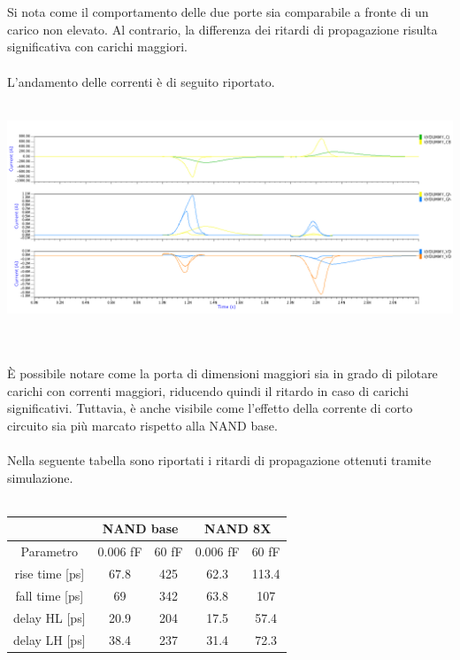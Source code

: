 \documentclass[11pt,  english, makeidx, a4paper, titlepage, oneside]{book}
\begin{document}
\\\\
Si nota come il comportamento delle due porte sia comparabile a fronte di un carico non elevato. Al contrario, la differenza dei ritardi di propagazione risulta significativa con carichi maggiori.
\\\\
L'andamento delle correnti è di seguito riportato.
\\\\
\centerline{\includegraphics[width=14cm]{./img/Lab_5/waveform_5.png}}
\\\\
È possibile notare come la porta di dimensioni maggiori sia in grado di pilotare carichi con correnti maggiori, riducendo quindi il ritardo in caso di carichi significativi. Tuttavia, è anche visibile come l'effetto della corrente di corto circuito sia più marcato rispetto alla NAND base.
\\\\
Nella seguente tabella sono riportati i ritardi di propagazione ottenuti tramite simulazione.
\\\\
\begin{center}
	\begin{tabular}{|c|c|c||c|c|}
	\hline
	& \multicolumn{2}{|c||}{NAND base} & \multicolumn{2}{|c|}{NAND 8X}\\
	\hline
	Parametro & 0.006 fF & 60 fF & 0.006 fF & 60 fF \\
	\hline
	rise time [ps] & 67.8 & 425 & 62.3 & 113.4\\
	\hline
	 fall time [ps] & 69 & 342 & 63.8 & 107 \\
	\hline
	delay HL [ps] & 20.9 & 204 & 17.5 & 57.4  \\
	\hline
	delay LH [ps] & 38.4 & 237 & 31.4 & 72.3 \\
	\hline
	\end{tabular}	
\end{center}
\end{document}
